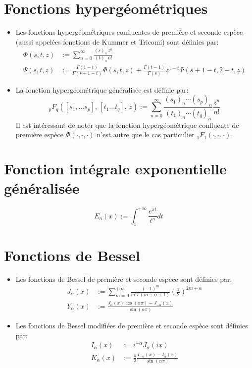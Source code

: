 \section*{Fonctions hypergéométriques}
\begin{itemize}
    \item Les fonctions hypergéométriques confluentes de première et seconde espèce (aussi appelées fonctions de Kummer et Tricomi) sont définies par:
    \[
        \begin{aligned}
            \Phi(s, t, z) &:= \sum_{n=0}^{\infty} \frac{{(s)}_n \, z^n}{{(t)}_n \, n!}  \\
            \Psi(s,t,z) &:= \frac{\Gamma(1-t)}{\Gamma(s+1-t)}\Phi(s,t,z)+\frac{\Gamma(t-1)}{\Gamma(s)}z^{1-t}\Phi(s+1-t,2-t,z)
        \end{aligned}
    \] 
    \item La fonction hypergéométrique généralisée est définie par:
    \[
    _p F_q\left([s_1,\dots s_p],\,[t_1\dots t_q],\,z\right):=\sum_{n=0}^\infty\frac{{(s_1)}_n\cdots{(s_p)}_n}{{(t_1)}_n\cdots {(t_q)}_n}\frac{z^n}{n!}
    \]
    Il est intéressant de noter que la fonction hypergéométrique confluente de première espèce $\Phi(\cdot,\cdot,\cdot)$ n'est autre que le cas particulier $_1F_1(\cdot,\cdot,\cdot)$.
\end{itemize}

\section*{Fonction intégrale exponentielle généralisée}
\[
E_n(x):=\int_1^{+\infty}\frac{e^{xt}}{t^n}dt
\]

\section*{Fonctions de Bessel}
\begin{itemize}
    \item Les fonctions de Bessel de première et seconde espèce sont définies par:
    \[
    \begin{aligned}
        J_\alpha(x)&:=\sum_{m=0}^{+\infty}\frac{(-1)^m}{m!\Gamma(m+\alpha+1)}{\left(\frac{x}{2}\right)}^{2m+\alpha} \\
        Y_\alpha(x)&:=\frac{J_\alpha(x)\cos(\alpha\pi)-J_{-\alpha}(x)}{\sin(\alpha\pi)}
    \end{aligned}
    \]
    \item Les fonctions de Bessel modifiées de première et seconde espèce sont définies par:
    \[
    \begin{aligned}
        I_\alpha(x)&:=i^{-\alpha}J_\alpha(ix)\\
        K_\alpha(x)&:=\frac{\pi}{2}\frac{I_{-\alpha}(x)-I_\alpha(x)}{\sin(\alpha\pi)}
    \end{aligned}
    \]
\end{itemize}

